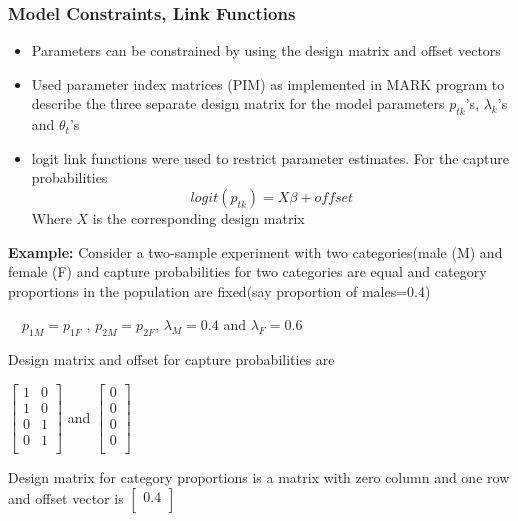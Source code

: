 \documentclass{beamer}
\begin{document}
\begin{frame} \frametitle{Model Constraints, Link Functions}
{\scriptsize  
\begin{itemize}
\item Parameters can be constrained by using the design matrix  and offset vectors 
\vspace{6pt}

\item Used parameter index matrices (PIM) as implemented in MARK program to describe the three separate design matrix for the model parameters $p_{tk}$'s, $\lambda_{k}$'s and $\theta_{t}$'s

\item logit link functions were used to restrict parameter estimates. For the capture probabilities
$$ logit(p_{tk}) = X \beta + offset$$
Where $X$ is the corresponding design matrix 
\end{itemize}
}

\begin{itemize}
{\scriptsize  
\item \textbf{Example:} Consider a two-sample experiment with two categories(male (M) and female (F) and capture probabilities for two categories are equal and category proportions in the population are fixed(say proportion of males=0.4)

$\quad p_{1M} = p_{1F}$ ,  $p_{2M} = p_{2F}$, $\lambda_{M} = 0.4$ and $\lambda_{F} = 0.6$
}
\vspace{3pt}

\begin{itemize}
{\tiny 
\item Design matrix and offset for capture probabilities are 
\vspace{3pt}

$ \begin{bmatrix}
1 & 0\\
1 & 0\\
0 & 1 \\
0 & 1 \\
 \end{bmatrix}$ and 
$ \begin{bmatrix}
0\\
0\\
0\\
0\\
\end{bmatrix}$
\vspace{6pt}

\item Design matrix for  category proportions is a matrix with zero column and one row and offset vector is   
$ \begin{bmatrix}
0.4\\
\end{bmatrix}$
}
\end{itemize}
\end{itemize}

\end{frame}
\end{document}
